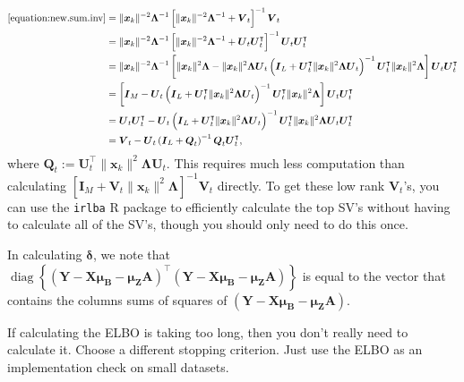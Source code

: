 \documentclass[11pt,authoryear]{article}
\DeclareMathOperator*{\diag}{diag}
\newcommand{\bs}[1]{\boldsymbol{#1}}
\begin{document}
\begin{align}
\eqref{equation:new.sum.inv} &= \|\bs{x}_k\|^{-2}\bs{\Lambda}^{-1}\left[\|\bs{x}_k\|^{-2}\bs{\Lambda}^{-1} + \bs{V}_t\right]^{-1}\bs{V}_t\\
&= \|\bs{x}_k\|^{-2}\bs{\Lambda}^{-1}\left[\|\bs{x}_k\|^{-2}\bs{\Lambda}^{-1} + \bs{U}_t\bs{U}_t^{\intercal}\right]^{-1}\bs{U}_t\bs{U}_t^{\intercal}\\
&= \|\bs{x}_k\|^{-2}\bs{\Lambda}^{-1}\left[\|\bs{x}_k\|^2\bs{\Lambda} - \|\bs{x}_k\|^2\bs{\Lambda}\bs{U}_t\left(\bs{I}_L + \bs{U}_t^{\intercal}\|\bs{x}_k\|^2\bs{\Lambda}\bs{U}_t\right)^{-1}\bs{U}_t^{\intercal}\|\bs{x}_k\|^2\bs{\Lambda}\right]\bs{U}_t\bs{U}_t^{\intercal}\\
&= \left[\bs{I}_M - \bs{U}_t\left(\bs{I}_L + \bs{U}_t^{\intercal}\|\bs{x}_k\|^2\bs{\Lambda}\bs{U}_t\right)^{-1}\bs{U}_t^{\intercal}\|\bs{x}_k\|^2\bs{\Lambda}\right]\bs{U}_t\bs{U}_t^{\intercal}\\
&= \bs{U}_t\bs{U}_t^{\intercal} - \bs{U}_t\left(\bs{I}_L + \bs{U}_t^{\intercal}\|\bs{x}_k\|^2\bs{\Lambda}\bs{U}_t\right)^{-1}\bs{U}_t^{\intercal}\|\bs{x}_k\|^2\bs{\Lambda}\bs{U}_t\bs{U}_t^{\intercal}\\
&= \bs{V}_t - \bs{U}_t\left(\bs{I}_L + \bs{Q}_t\right)^{-1}\bs{Q}_t\bs{U}_t^{\intercal},
\end{align}
where $\bs{Q}_t :=
\bs{U}_t^{\intercal}\|\bs{x}_k\|^2\bs{\Lambda}\bs{U}_t$. This requires
much less computation than calculating $\left[\bs{I}_M +
  \bs{V}_t\|\bs{x}_k\|^2\bs{\Lambda}\right]^{-1}\bs{V}_t$ directly. To
get these low rank $\bs{V}_t$'s, you can use the \texttt{irlba} R
package to efficiently calculate the top SV's without having to
calculate all of the SV's, though you should only need to do this
once.

In calculating $\bs{\delta}$, we note that
$\diag\left\{(\bs{Y}-\bs{X}\bs{\mu}_{\bs{B}} -
  \bs{\mu}_{\bs{Z}}\bs{A})^{\intercal}(\bs{Y}-\bs{X}\bs{\mu}_{\bs{B}}
  - \bs{\mu}_{\bs{Z}}\bs{A})\right\}$ is equal to the vector that
contains the columns sums of squares of
$(\bs{Y}-\bs{X}\bs{\mu}_{\bs{B}} - \bs{\mu}_{\bs{Z}}\bs{A})$.

If calculating the ELBO is taking too long, then you don't really need
to calculate it. Choose a different stopping criterion. Just use the
ELBO as an implementation check on small datasets.




\end{document}
